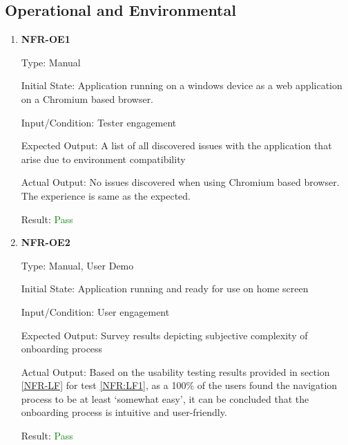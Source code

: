 \documentclass[12pt, titlepage]{article}
\begin{document}
\subsection{Operational and Environmental}
\begin{enumerate}
\item{\textbf{NFR-OE1}} \label{NFR:OE1}

Type: Manual

Initial State: Application running on a windows device as a web application on a
Chromium based browser.

Input/Condition: Tester engagement

Expected Output: A list of all discovered issues with the application that arise
due to environment compatibility

Actual Output: No issues discovered when using Chromium based browser. The experience is same as
the expected.

Result: \textcolor{green}{Pass} 
            
\item\textbf{{NFR-OE2}} \label{NFR:OE2}

Type: Manual, User Demo

Initial State: Application running and ready for use on home screen

Input/Condition: User engagement

Expected Output: Survey results depicting subjective complexity of onboarding
process

Actual Output: \newline
Based on the usability testing results provided in section \ref{NFR-LF} for test \ref{NFR:LF1}, as a 100\% 
of the users found the navigation process to be at least `somewhat easy', it can be concluded that the onboarding
process is intuitive and user-friendly.

Result: \textcolor{green}{Pass}
\end{enumerate}
\end{document}
